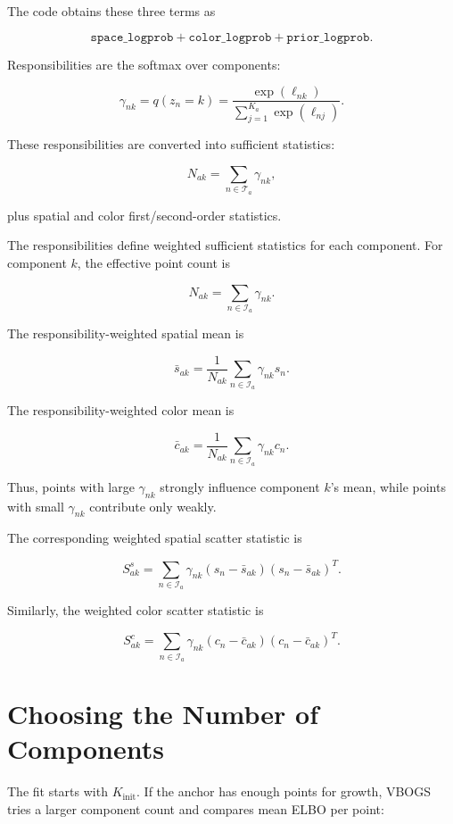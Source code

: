 \documentclass[11pt]{article}
\begin{document}
The code obtains these three terms as

\[
  \texttt{space\_logprob}
  +
  \texttt{color\_logprob}
  +
  \texttt{prior\_logprob}.
\]

Responsibilities are the softmax over components:

\[
  \gamma_{nk}
  =
  q(z_n = k)
  =
  \frac{\exp(\ell_{nk})}
       {\sum_{j=1}^{K_a} \exp(\ell_{nj})}.
\]

These responsibilities are converted into sufficient statistics:

\[
  N_{ak} = \sum_{n \in \mathcal{T}_a} \gamma_{nk},
\]

plus spatial and color first/second-order statistics. 

The responsibilities define weighted sufficient statistics for each component.
For component \(k\), the effective point count is

\[
  N_{ak}
  =
  \sum_{n \in \mathcal{I}_a}
  \gamma_{nk}.
\]

The responsibility-weighted spatial mean is

\[
  \bar{s}_{ak}
  =
  \frac{1}{N_{ak}}
  \sum_{n \in \mathcal{I}_a}
  \gamma_{nk} s_n.
\]

The responsibility-weighted color mean is

\[
  \bar{c}_{ak}
  =
  \frac{1}{N_{ak}}
  \sum_{n \in \mathcal{I}_a}
  \gamma_{nk} c_n.
\]

Thus, points with large \(\gamma_{nk}\) strongly influence component \(k\)'s
mean, while points with small \(\gamma_{nk}\) contribute only weakly.

The corresponding weighted spatial scatter statistic is

\[
  S^s_{ak}
  =
  \sum_{n \in \mathcal{I}_a}
  \gamma_{nk}
  \left(s_n - \bar{s}_{ak}\right)
  \left(s_n - \bar{s}_{ak}\right)^{T}.
\]

Similarly, the weighted color scatter statistic is

\[
  S^c_{ak}
  =
  \sum_{n \in \mathcal{I}_a}
  \gamma_{nk}
  \left(c_n - \bar{c}_{ak}\right)
  \left(c_n - \bar{c}_{ak}\right)^{T}.
\]

\section{Choosing the Number of Components}

The fit starts with \(K_{\mathrm{init}}\). If the anchor has enough points for
growth, VBOGS tries a larger component count and compares mean ELBO per point:
\end{document}
